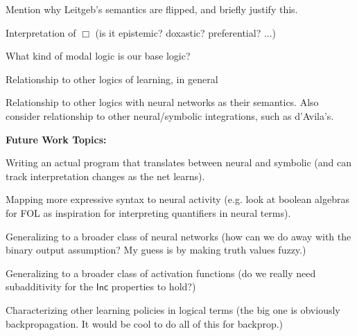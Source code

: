 \documentclass[12pt]{article}
\theoremstyle{definition}
\newcommand{\Inc}{\textsf{Inc}}
\begin{document}
\begin{compactitem}
    \item[\textcolor{green}{\checkmark}] Mention why Leitgeb's semantics are flipped, and briefly justify this.
    
    \item[\textcolor{green}{\checkmark}] Interpretation of $\Box$ (is it epistemic?  doxastic?  preferential? ...)
    
    \item[\textcolor{green}{\checkmark}] What kind of modal logic is our base logic?
    
    \item[\textcolor{green}{\checkmark}] Relationship to other logics of learning, in general
    
    \item[\textcolor{green}{\checkmark}] Relationship to other logics with neural networks as their semantics.  Also consider relationship to other neural/symbolic integrations, such as d'Avila's.
\end{compactitem}

\textbf{\textcolor{myblue}{Future Work Topics:}}

\begin{compactitem}
    \item Writing an actual program that translates between neural and symbolic (and can track interpretation changes as the net learns).

    \item Mapping more expressive syntax to neural activity (e.g. look at boolean algebras for FOL as inspiration for interpreting quantifiers in neural terms).
    
    \item Generalizing to a broader class of neural networks (how can we do away with the binary output assumption?  My guess is by making truth values fuzzy.)
    
    \item Generalizing to a broader class of activation functions (do we really need subadditivity for the $\Inc$ properties to hold?)
    
    \item Characterizing other learning policies in logical terms (the big one is obviously backpropagation.  It would be cool to do all of this for backprop.)
    
\end{compactitem}




\end{document}
